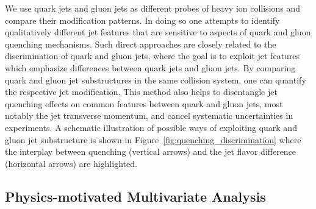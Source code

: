 \documentclass[notoc,preprintnumbers]{JHEP3}
\begin{document}
We use quark jets and gluon jets as different probes of heavy ion collisions and compare their modification patterns. In doing so one attempts to identify qualitatively different jet features that are sensitive to aspects of quark and gluon quenching mechanisms. Such direct approaches are closely related to the discrimination of quark and gluon jets, where the goal is to exploit jet features which emphasize differences between quark jets and gluon jets. By comparing quark and gluon jet substructures in the same collision system, one can quantify the respective jet modification. This method also helps to disentangle jet quenching effects on common features between quark and gluon jets, most notably the jet transverse momentum, and cancel systematic uncertainties in experiments. A schematic illustration of possible ways of exploiting quark and gluon jet substructure is shown in Figure~\ref{fig:quenching_discrimination} where the interplay between quenching (vertical arrows) and the jet flavor difference (horizontal arrows) are highlighted.

\subsection{Physics-motivated Multivariate Analysis}
\label{sec:mva}
\end{document}
